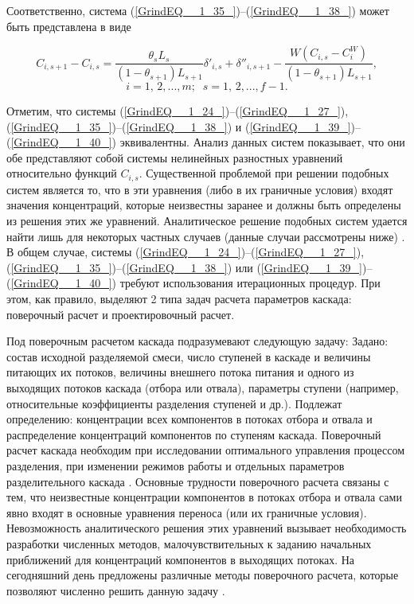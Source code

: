 Соответственно, система (\ref{GrindEQ__1_35_})--(\ref{GrindEQ__1_38_}) может быть представлена в виде

\begin{equation} \label{GrindEQ__1_40_} 
  C_{i,s+1} -C_{i,s} =\frac{\theta _{s} L_{s} }{(1-\theta _{s+1} )L_{s+1} } \delta '_{i,s} +\delta ''_{i,s+1} -\frac{W(C_{i,s} -C_{i}^{W} )}{(1-\theta _{s+1} )L_{s+1} } ,        
  \end{equation} 
  \[i=1,\, 2,...,m;\; \; s=1,\, 2,...,f-1.\] 

Отметим, что системы (\ref{GrindEQ__1_24_})--(\ref{GrindEQ__1_27_}), (\ref{GrindEQ__1_35_})--(\ref{GrindEQ__1_38_}) и (\ref{GrindEQ__1_39_})--(\ref{GrindEQ__1_40_}) эквивалентны. Анализ данных систем показывает, что они обе представляют собой системы нелинейных разностных уравнений относительно функций $C_{i,s}$. Существенной проблемой при решении подобных систем является то, что в эти уравнения (либо в их граничные условия) входят значения концентраций, которые неизвестны заранее и должны быть определены из решения этих же уравнений. Аналитическое решение подобных систем удается найти лишь для некоторых частных случаев (данные случаи рассмотрены ниже) \cite{sulaberidzeTeoriyaKaskadovDlya2011}. В общем случае, системы (\ref{GrindEQ__1_24_})--(\ref{GrindEQ__1_27_}), (\ref{GrindEQ__1_35_})--(\ref{GrindEQ__1_38_}) или (\ref{GrindEQ__1_39_})--(\ref{GrindEQ__1_40_}) требуют использования итерационных процедур. При этом, как правило, выделяют 2 типа задач расчета параметров каскада: поверочный расчет и проектировочный расчет.

Под поверочным расчетом каскада подразумевают следующую задачу:
Задано: состав исходной разделяемой смеси,  число ступеней в каскаде и величины питающих их потоков, величины внешнего потока питания и одного из выходящих потоков каскада (отбора или отвала), параметры ступени (например, относительные коэффициенты разделения ступеней и др.).
Подлежат определению: концентрации всех компонентов в потоках отбора  и отвала и распределение концентраций компонентов по ступеням каскада. 
Поверочный расчет каскада необходим при исследовании оптимального управления процессом разделения, при изменении режимов работы и отдельных параметров разделительного каскада \cite{sulaberidzeTeoriyaKaskadovDlya2011}. Основные трудности поверочного расчета связаны с тем, что неизвестные концентрации компонентов в потоках отбора и отвала сами явно входят в основные уравнения переноса (или их граничные условия). Невозможность аналитического решения этих уравнений вызывает необходимость разработки численных методов, малочувствительных к заданию начальных приближений для концентраций компонентов в выходящих потоках. На сегодняшний день предложены различные методы поверочного расчета, которые позволяют численно решить данную задачу \cite{sulaberidzeTeoriyaKaskadovDlya2011, sazykinUsovershenstvovannyyMetodRascheta1997, wuCalculationMethodsDetermining1988, holpanovEffektivnyyMetodRascheta1998, potapovCalculationSquaredoffCascades1996, zengRobustEfficientCalculation2000}.

